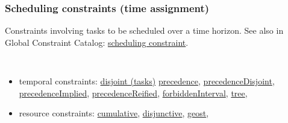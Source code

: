 \subsubsection{Scheduling constraints (time assignment)}\label{model:schedulingconstraints}\hypertarget{model:schedulingconstraints}{}
Constraints involving tasks to be scheduled over a time horizon.
See also in Global Constraint Catalog: \href{http://www.emn.fr/x-info/sdemasse/gccat/Kscheduling_constraint.html}{scheduling constraint}.

\vspace{1em}\noindent\begin{notedef}\tt
   \begin{itemize}
   \item temporal constraints:
\hyperlink{disjoint}{disjoint (tasks)} 
\hyperlink{precedence:precedenceconstraint}{precedence}, 
\hyperlink{precedencedisjoint:precedencedisjointconstraint}{precedenceDisjoint}, 
\hyperlink{precedenceimplied:precedenceimpliedconstraint}{precedenceImplied}, 
\hyperlink{precedencereified:precedencereifiedconstraint}{precedenceReified},
\hyperlink{forbiddeninterval:forbiddenintervalconstraint}{forbiddenInterval},
\hyperlink{tree:treeconstraint}{tree},
   \item resource constraints: 
\hyperlink{cumulative:cumulativeconstraint}{cumulative}, 
\hyperlink{disjunctive:disjunctiveconstraint}{disjunctive}, 
\hyperlink{geost:geostconstraint}{geost}, 
 \end{itemize}
\end{notedef}

